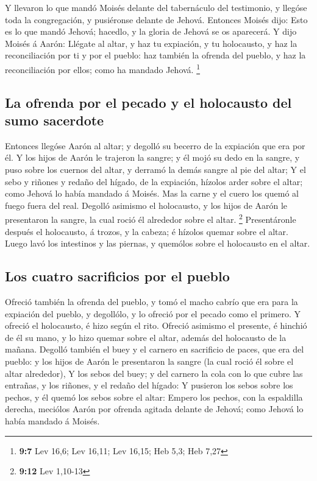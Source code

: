  Y llevaron lo que mandó Moisés delante del tabernáculo
del testimonio, y llegóse toda la congregación, y pusiéronse delante de
Jehová.  Entonces Moisés dijo: Esto es lo que mandó
Jehová; hacedlo, y la gloria de Jehová se os aparecerá.  Y
dijo Moisés á Aarón: Llégate al altar, y haz tu expiación, y tu
holocausto, y haz la reconciliación por ti y por el pueblo: haz también
la ofrenda del pueblo, y haz la reconciliación por ellos; como ha
mandado Jehová. \footnote{\textbf{9:7} Lev 16,6; Lev 16,11; Lev 16,15;
  Heb 5,3; Heb 7,27}

\hypertarget{la-ofrenda-por-el-pecado-y-el-holocausto-del-sumo-sacerdote}{%
\subsection{La ofrenda por el pecado y el holocausto del sumo
sacerdote}\label{la-ofrenda-por-el-pecado-y-el-holocausto-del-sumo-sacerdote}}

 Entonces llegóse Aarón al altar; y degolló su becerro de
la expiación que era por él.  Y los hijos de Aarón le
trajeron la sangre; y él mojó su dedo en la sangre, y puso sobre los
cuernos del altar, y derramó la demás sangre al pie del altar;
 Y el sebo y riñones y redaño del hígado, de la
expiación, hízolos arder sobre el altar; como Jehová lo había mandado á
Moisés.  Mas la carne y el cuero los quemó al fuego fuera
del real.  Degolló asimismo el holocausto, y los hijos de
Aarón le presentaron la sangre, la cual roció él alrededor sobre el
altar. \footnote{\textbf{9:12} Lev 1,10-13} 
Presentáronle después el holocausto, á trozos, y la cabeza; é hízolos
quemar sobre el altar.  Luego lavó los intestinos y las
piernas, y quemólos sobre el holocausto en el altar.

\hypertarget{los-cuatro-sacrificios-por-el-pueblo}{%
\subsection{Los cuatro sacrificios por el
pueblo}\label{los-cuatro-sacrificios-por-el-pueblo}}

 Ofreció también la ofrenda del pueblo, y tomó el macho
cabrío que era para la expiación del pueblo, y degollólo, y lo ofreció
por el pecado como el primero.  Y ofreció el holocausto,
é hizo según el rito.  Ofreció asimismo el presente, é
hinchió de él su mano, y lo hizo quemar sobre el altar, además del
holocausto de la mañana.  Degolló también el buey y el
carnero en sacrificio de paces, que era del pueblo: y los hijos de Aarón
le presentaron la sangre (la cual roció él sobre el altar alrededor),
 Y los sebos del buey; y del carnero la cola con lo que
cubre las entrañas, y los riñones, y el redaño del hígado:
 Y pusieron los sebos sobre los pechos, y él quemó los
sebos sobre el altar:  Empero los pechos, con la
espaldilla derecha, meciólos Aarón por ofrenda agitada delante de
Jehová; como Jehová lo había mandado á Moisés.

